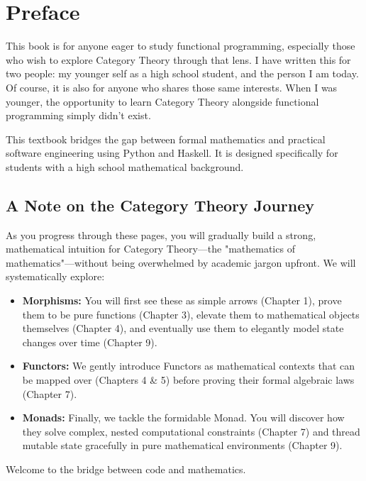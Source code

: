 \chapter*{Preface}
This book is for anyone eager to study functional programming, especially those who wish to explore Category Theory through that lens. I have written this for two people: my younger self as a high school student, and the person I am today. Of course, it is also for anyone who shares those same interests. When I was younger, the opportunity to learn Category Theory alongside functional programming simply didn’t exist.

This textbook bridges the gap between formal mathematics and practical software engineering using Python and Haskell. It is designed specifically for students with a high school mathematical background.

\section*{A Note on the Category Theory Journey}
As you progress through these pages, you will gradually build a strong, mathematical intuition for Category Theory---the "mathematics of mathematics"---without being overwhelmed by academic jargon upfront. We will systematically explore:

\begin{itemize}
    \item \textbf{Morphisms:} You will first see these as simple arrows (Chapter 1), prove them to be pure functions (Chapter 3), elevate them to mathematical objects themselves (Chapter 4), and eventually use them to elegantly model state changes over time (Chapter 9).
    \item \textbf{Functors:} We gently introduce Functors as mathematical contexts that can be mapped over (Chapters 4 \& 5) before proving their formal algebraic laws (Chapter 7).
    \item \textbf{Monads:} Finally, we tackle the formidable Monad. You will discover how they solve complex, nested computational constraints (Chapter 7) and thread mutable state gracefully in pure mathematical environments (Chapter 9).
\end{itemize}

Welcome to the bridge between code and mathematics.